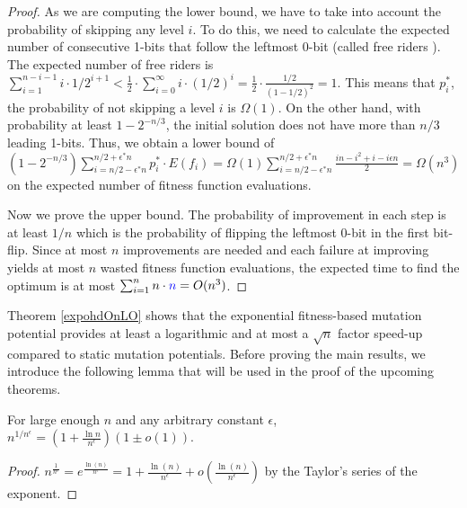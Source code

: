 \documentclass[lettersize,journal]{IEEEtran}
\begin{document}
\begin{proof}
As we are computing the lower bound, we have to take into account the probability of skipping any level $i$. To do this, we need to calculate the expected number of consecutive 1-bits that follow the leftmost 0-bit (called free riders \cite{DrosteJansenWegener2002}). The expected number of free riders is $\sum_{i=1}^{n-i-1} i \cdot 1/2^{i+1} < \frac{1}{2} \cdot \sum_{i=0}^{\infty} i \cdot (1/2)^i= \frac{1}{2} \cdot \frac{1/2}{(1-1/2)^2}=1$. This means that {\color{blue}$p^{*}_{i}$}, the probability of not skipping a level $i$ is $\Omega(1)$.
On the other hand, with probability at least $1- 2^{-n/3}$, the initial solution does not have more than $n/3$ leading 1-bits. Thus, we obtain a lower 
bound of  $(1-2^{-n/3}) \sum_{i=n/2-\epsilon^*n}^{n/2+\epsilon^*n} p^{*}_{i}\cdot E(f_i)=\Omega(1) \sum_{i=n/2-\epsilon^*n}^{n/2+\epsilon^*n} \frac{in-i^2+i-i\epsilon n}{2}=\Omega(n^3)$ on the expected number of fitness function evaluations.

Now we prove the upper bound. The probability of improvement in each step is at least $1/n$ which is the probability of flipping the leftmost 0-bit {\color{blue} in the first} bit-flip. Since at most $n$ improvements are needed and each failure at improving yields {\color{blue} at most $n$} wasted fitness function evaluations, the expected time to find the optimum is at most $\sum_{i=1}^n n \cdot {\color{blue}n}= O(n^3)$.

\end{proof}


Theorem \ref{expohdOnLO} shows that the exponential fitness-based mutation 
potential provides at least a logarithmic and at most a $\sqrt 
n$ factor speed-up compared to static mutation potentials. Before proving the main results, we introduce the following  lemma that will be used in the proof of the upcoming theorems.
\begin{lemma}\label{lem:expo}
For large enough $n$ and {\color{blue}any arbitrary constant} $\epsilon$, 
$n^{1/n^{\epsilon}}= (1+\frac{\ln{n}}{n^{\epsilon}})(1 \pm o(1))$.
\end{lemma}
\begin{proof}
	$n^{\frac{1}{n^\epsilon}} = e^{\frac{\ln(n)}{n^\epsilon}} = 1 + \frac{\ln(n)}{n^\epsilon} + o(\frac{\ln(n)}{n^\epsilon})$ by the Taylor's series of the exponent.
	
\end{proof}
\end{document}
